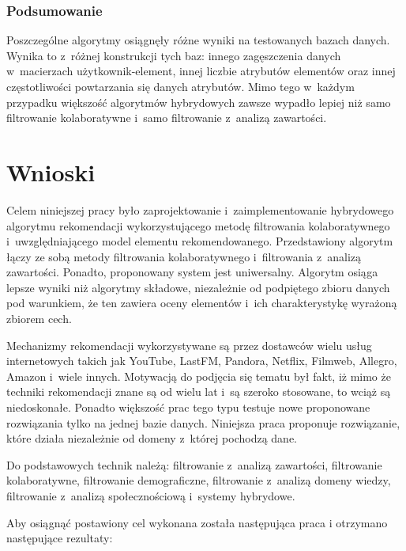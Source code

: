 \documentclass[twoside]{iisthesis}
\begin{document}
		
		\subsection{Podsumowanie}
		
		Poszczególne algorytmy osiągnęły różne wyniki na testowanych bazach danych. Wynika to z~różnej konstrukcji tych baz: innego zagęszczenia danych w~macierzach użytkownik-element, innej liczbie atrybutów elementów oraz innej częstotliwości powtarzania się danych atrybutów. Mimo tego w~każdym przypadku większość algorytmów hybrydowych zawsze wypadło lepiej niż samo filtrowanie kolaboratywne i~samo filtrowanie z~analizą zawartości. 
	

\chapter{Wnioski}

	Celem niniejszej pracy było zaprojektowanie i~zaimplementowanie hybrydowego algorytmu rekomendacji wykorzystującego metodę filtrowania kolaboratywnego i~uwzględniającego model elementu rekomendowanego. Przedstawiony algorytm łączy ze sobą metody filtrowania kolaboratywnego i~filtrowania z~analizą zawartości. Ponadto, proponowany system jest uniwersalny. Algorytm osiąga lepsze wyniki niż algorytmy składowe, niezależnie od podpiętego zbioru danych pod warunkiem, że ten zawiera oceny elementów i~ich charakterystykę wyrażoną zbiorem cech.

	Mechanizmy rekomendacji wykorzystywane są przez dostawców wielu usług internetowych takich jak YouTube, LastFM, Pandora, Netflix, Filmweb, Allegro, Amazon i~wiele innych. Motywacją do podjęcia się tematu był fakt, iż mimo że techniki rekomendacji znane są od wielu lat i~są szeroko stosowane, to wciąż są niedoskonałe. Ponadto większość prac tego typu testuje nowe proponowane rozwiązania tylko na jednej bazie danych. Niniejsza praca proponuje rozwiązanie, które działa niezależnie od domeny z~której pochodzą dane.
	
	Do podstawowych technik należą: filtrowanie z~analizą zawartości, filtrowanie kolaboratywne, filtrowanie demograficzne, filtrowanie z~analizą domeny wiedzy, filtrowanie z~analizą społecznościową i~systemy hybrydowe. 
	
	Aby osiągnąć postawiony cel wykonana została następująca praca i otrzymano następujące rezultaty:
	
\end{document}
